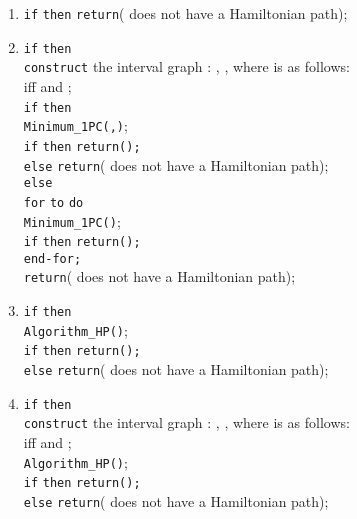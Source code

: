 \documentclass[10pt]{article}
\begin{document}
{\begin{enumerate}
  \item {\tt if}  {\tt then} {\tt return}( does not have a Hamiltonian path);
  \item {\tt if}  {\tt then} \\
         \phantom{if} {\tt construct} the interval graph : , ,
         where  is as follows: \\
         \phantom{if} \phantom{if} \phantom{if}  iff  and ;\\
         \phantom{if} {\tt if}  {\tt then} \\
         \phantom{if} \phantom{if} \phantom{if} {\tt Minimum\_1PC(,)};\\
         \phantom{if} \phantom{if} \phantom{if} {\tt if} 
         {\tt then} {\tt return();}\\
         \phantom{if} \phantom{if} \phantom{if} {\tt else} {\tt return}( does not have a Hamiltonian path);\\
         \phantom{if} {\tt else} \\
         \phantom{if} \phantom{if} \phantom{if} {\tt for}  {\tt to}  {\tt do} \\
         \phantom{if} \phantom{if} \phantom{if} \phantom{for}  {\tt Minimum\_1PC()};\\
         \phantom{if} \phantom{if} \phantom{if} \phantom{for} {\tt if}  {\tt then} {\tt return();}\\
         \phantom{if} \phantom{if} \phantom{if} {\tt end-for;}\\
         \phantom{if} \phantom{if} \phantom{if} {\tt return}( does not have a Hamiltonian path);
  \item {\tt if}  {\tt then} \\
         \phantom{if} {\tt Algorithm\_HP()};\\
         \phantom{if} {\tt if}  {\tt then} {\tt return();}\\
         \phantom{if} {\tt else} {\tt return}( does not have a Hamiltonian path);
  \item {\tt if}  {\tt then} \\
         \phantom{if} {\tt construct} the interval graph : , ,
         where  is as follows: \\
         \phantom{if} \phantom{if}  iff  and ;\\
         \phantom{if} {\tt Algorithm\_HP()};\\
         \phantom{if} {\tt if}  {\tt then} {\tt return();}\\
         \phantom{if} {\tt else} {\tt return}( does not have a Hamiltonian path);
\end{enumerate}


}
\end{document}
